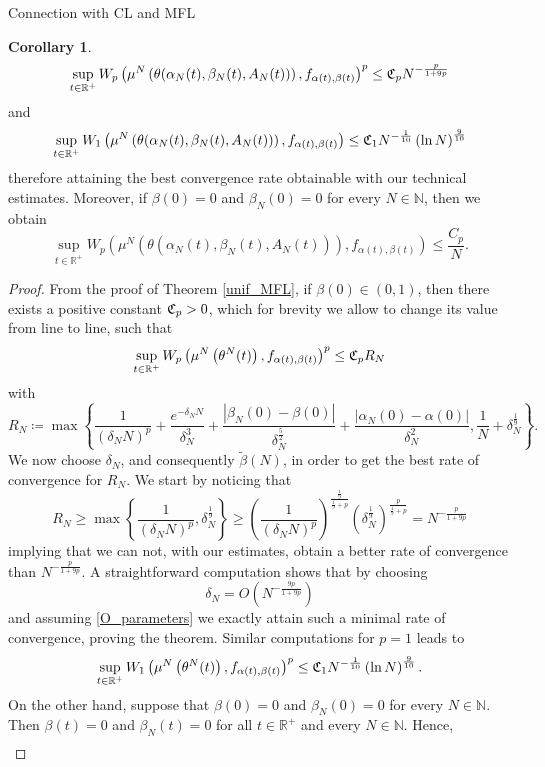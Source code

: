 \documentclass{article}
\theoremstyle{definition}
\newtheorem{corollary}[definition]{Corollary}
\newcommand{\R}{\mathbb{R}}
\newcommand{\N}{\mathbb{N}}
\begin{document}
\begin{section}{Connection with CL and MFL}
\begin{corollary}
\begin{equation}
    \sup_{t\in\R^+}W_p\left(\mu^N\left(\theta(\alpha_N(t),\beta_N(t),A_N(t))\right),f_{\alpha(t),\beta(t)}\right)^p\leq \frak{C}_pN^{-\frac{p}{1+9p}}
\end{equation}
and
\begin{equation}\label{W_1_rate}
    \sup_{t\in\R^+}W_1\left(\mu^N\left(\theta(\alpha_N(t),\beta_N(t),A_N(t))\right),f_{\alpha(t),\beta(t)}\right)\leq \frak{C}_1N^{-\frac{1}{10}}\left(\ln N\right)^{\frac{9}{10}}
\end{equation}
therefore attaining the best convergence rate obtainable with our technical estimates.
Moreover, if $\beta(0)=0$ and $\beta_N(0)=0$ for every $N\in\N$, then we obtain
$$\sup_{t\in\R^+}W_p\left(\mu^N\left(\theta(\alpha_N(t),\beta_N(t),A_N(t))\right),f_{\alpha(t),\beta(t)}\right)\leq \frac{C_p}{N}.$$
\end{corollary}
\begin{proof}
From the proof of Theorem \ref{unif_MFL}, if $\beta(0)\in(0,1)$, then there exists a positive constant $\frak{C}_p>0$, which for brevity we allow to change its value from line to line, such that
$$\sup_{t\in\R^+}W_p\left(\mu^N\left(\theta^N(t)\right),f_{\alpha(t),\beta(t)}\right)^p\leq \frak{C}_pR_N$$
    with
    $$R_N\coloneqq\max\left\{\frac{1}{\left(\delta_NN\right)^p}+\frac{e^{-\delta_NN}}{\delta_N^3}+\frac{|\beta_N(0)-\beta(0)|}{\delta_N^{\frac{5}{2}}}+\frac{|\alpha_N(0)-\alpha(0)|}{\delta_N^{2}},\frac{1}{N}+\delta_N^{\frac{1}{9}}\right\}.$$
        We now choose $\delta_N$, and consequently $\tilde{\beta}(N)$, in order to get the best rate of convergence for $R_N$. We start by noticing that
    $$R_N\geq\max\left\{\frac{1}{\left(\delta_NN\right)^p},\delta_N^{\frac{1}{9}}\right\}\geq\left(\frac{1}{\left(\delta_NN\right)^p}\right)^{\frac{\frac{1}{9}}{\frac{1}{9}+p}}\left(\delta_N^{\frac{1}{9}}\right)^{\frac{p}{\frac{1}{9}+p}}=N^{-\frac{p}{1+9p}}$$
    implying that we can not, with our estimates, obtain a better rate of convergence than $N^{-\frac{p}{1+9p}}$. A straightforward computation shows that by choosing
    $$\delta_N=O\left(N^{-\frac{9p}{1+9p}}\right)$$
    and assuming \eqref{O_parameters} we exactly attain such a minimal rate of convergence, proving the theorem. Similar computations for $p=1$ leads to 
$$\sup_{t\in\R^+}W_1\left(\mu^N\left(\theta^N(t)\right),f_{\alpha(t),\beta(t)}\right)^p\leq \frak{C}_1N^{-\frac{1}{10}}\left(\ln N\right)^{\frac{9}{10}}.$$
On the other hand, suppose that $\beta(0)=0$ and $\beta_N(0)=0$ for every $N\in\N$. Then $\beta(t)=0$ and $\beta_N(t)=0$ for all $t\in\R^+$ and every $N\in\N$. Hence,
\begin{align*}

\end{align*}
\end{proof}
\end{section}
\end{document}
